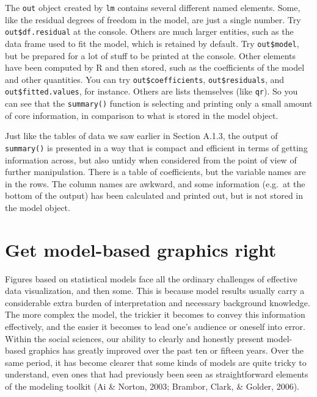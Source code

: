 \documentclass[]{book}
\begin{document}
The \texttt{out} object created by \texttt{lm} contains several different named elements. Some, like the residual degrees of freedom in the model, are just a single number. Try \texttt{out\$df.residual} at the console. Others are much larger entities, such as the data frame used to fit the model, which is retained by default. Try \texttt{out\$model}, but be prepared for a lot of stuff to be printed at the console. Other elements have been computed by R and then stored, such as the coefficients of the model and other quantities. You can try \texttt{out\$coefficients}, \texttt{out\$residuals}, and \texttt{out\$fitted.values}, for instance. Others are lists themselves (like \texttt{qr}). So you can see that the \texttt{summary()} function is selecting and printing only a small amount of core information, in comparison to what is stored in the model object.

Just like the tables of data we saw earlier in Section A.1.3, the output of \texttt{summary()} is presented in a way that is compact and efficient in terms of getting information across, but also untidy when considered from the point of view of further manipulation. There is a table of coefficients, but the variable names are in the rows. The column names are awkward, and some information (e.g.~at the bottom of the output) has been calculated and printed out, but is not stored in the model object.

\hypertarget{get-model-based-graphics-right}{%
\section{Get model-based graphics right}\label{get-model-based-graphics-right}}

Figures based on statistical models face all the ordinary challenges of effective data visualization, and then some. This is because model results usually carry a considerable extra burden of interpretation and necessary background knowledge. The more complex the model, the trickier it becomes to convey this information effectively, and the easier it becomes to lead one's audience or oneself into error. Within the social sciences, our ability to clearly and honestly present model-based graphics has greatly improved over the past ten or fifteen years. Over the same period, it has become clearer that some kinds of models are quite tricky to understand, even ones that had previously been seen as straightforward elements of the modeling toolkit (Ai \& Norton, 2003; Brambor, Clark, \& Golder, 2006).
\end{document}
